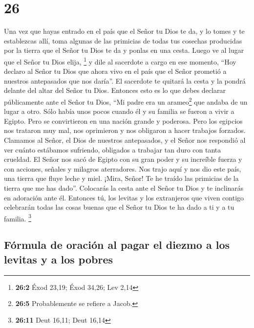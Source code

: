 \hypertarget{section-25}{%
\section{26}\label{section-25}}

 Una vez que hayas entrado en el país que el Señor tu Dios
te da, y lo tomes y te establezcas allí,  toma algunas de
las primicias de todas tus cosechas producidas por la tierra que el
Señor tu Dios te da y ponlas en una cesta. Luego ve al lugar que el
Señor tu Dios elija, \footnote{\textbf{26:2} Éxod 23,19; Éxod 34,26; Lev
  2,14}  y dile al sacerdote a cargo en ese momento, ``Hoy
declaro al Señor tu Dios que ahora vivo en el país que el Señor prometió
a nuestros antepasados que nos daría''.  El sacerdote te
quitará la cesta y la pondrá delante del altar del Señor tu Dios.
 Entonces esto es lo que debes declarar públicamente ante
el Señor tu Dios, ``Mi padre era un arameo\footnote{\textbf{26:5}
  Probablemente se refiere a Jacob.} que andaba de un lugar a otro. Sólo
había unos pocos cuando él y su familia se fueron a vivir a Egipto. Pero
se convirtieron en una nación grande y poderosa.  Pero los
egipcios nos trataron muy mal, nos oprimieron y nos obligaron a hacer
trabajos forzados.  Clamamos al Señor, el Dios de nuestros
antepasados, y el Señor nos respondió al ver cuánto estábamos sufriendo,
obligados a trabajar tan duro con tanta crueldad.  El
Señor nos sacó de Egipto con su gran poder y su increíble fuerza y con
acciones, señales y milagros aterradores.  Nos trajo aquí
y nos dio este país, una tierra que fluye leche y miel. 
¡Mira, Señor! Te he traído las primicias de la tierra que me has dado''.
Colocarás la cesta ante el Señor tu Dios y te inclinarás en adoración
ante él.  Entonces tú, los levitas y los extranjeros que
viven contigo celebrarán todas las cosas buenas que el Señor tu Dios te
ha dado a ti y a tu familia. \footnote{\textbf{26:11} Deut 16,11; Deut
  16,14}

\hypertarget{fuxf3rmula-de-oraciuxf3n-al-pagar-el-diezmo-a-los-levitas-y-a-los-pobres}{%
\subsection{Fórmula de oración al pagar el diezmo a los levitas y a los
pobres}\label{fuxf3rmula-de-oraciuxf3n-al-pagar-el-diezmo-a-los-levitas-y-a-los-pobres}}

